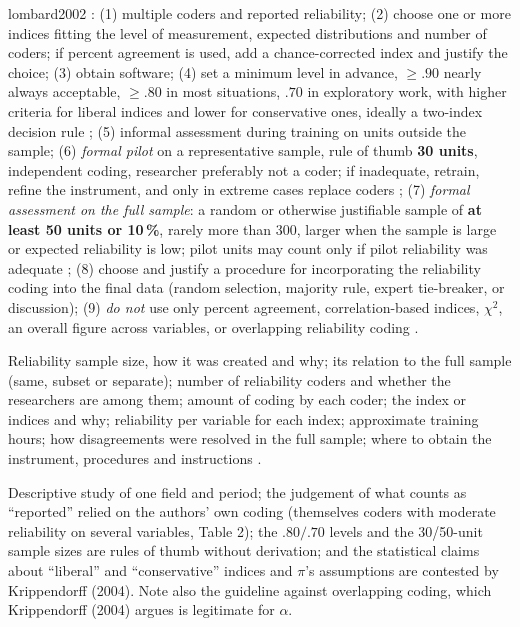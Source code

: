 \begin{papercard}{lombard2002}
 :
(1) multiple coders and reported reliability; (2) choose one or more indices fitting the level of measurement, expected distributions and number of coders; if percent agreement is used, add a chance-corrected index and justify the choice; (3) obtain software; (4) set a minimum level in advance, $\ge.90$ nearly always acceptable, $\ge.80$ in most situations, $.70$ in exploratory work, with higher criteria for liberal indices and lower for conservative ones, ideally a two-index decision rule ; (5) informal assessment during training on units outside the sample; (6) \emph{formal pilot} on a representative sample, rule of thumb \textbf{30 units}, independent coding, researcher preferably not a coder; if inadequate, retrain, refine the instrument, and only in extreme cases replace coders ; (7) \emph{formal assessment on the full sample}: a random or otherwise justifiable sample of \textbf{at least 50 units or 10\,\%}, rarely more than 300, larger when the sample is large or expected reliability is low; pilot units may count only if pilot reliability was adequate ; (8) choose and justify a procedure for incorporating the reliability coding into the final data (random selection, majority rule, expert tie-breaker, or discussion); (9) \emph{do not} use only percent agreement, correlation-based indices, $\chi^2$, an overall figure across variables, or overlapping reliability coding .

 Reliability sample size, how it was created and why; its relation to the full sample (same, subset or separate); number of reliability coders and whether the researchers are among them; amount of coding by each coder; the index or indices and why; reliability per variable for each index; approximate training hours; how disagreements were resolved in the full sample; where to obtain the instrument, procedures and instructions .

 Descriptive study of one field and period; the judgement of what counts as ``reported'' relied on the authors' own coding (themselves coders with moderate reliability on several variables, Table 2); the $.80/.70$ levels and the 30/50-unit sample sizes are rules of thumb without derivation; and the statistical claims about ``liberal'' and ``conservative'' indices and $\pi$'s assumptions are contested by Krippendorff (2004). Note also the guideline against overlapping coding, which Krippendorff (2004) argues is legitimate for $\alpha$.


\end{papercard}
